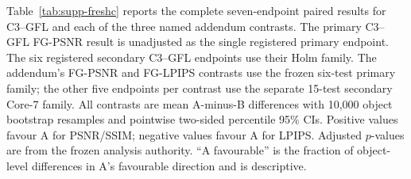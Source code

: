 \documentclass[11pt]{article}
\begin{document}
Table~\ref{tab:supp-freshc} reports the complete seven-endpoint paired results for C3--GFL and each of the three named addendum contrasts. The primary C3--GFL FG-PSNR result is unadjusted as the single registered primary endpoint. The six registered secondary C3--GFL endpoints use their Holm family. The addendum's FG-PSNR and FG-LPIPS contrasts use the frozen six-test primary family; the other five endpoints per contrast use the separate 15-test secondary Core-7 family. All contrasts are mean A-minus-B differences with 10,000 object bootstrap resamples and pointwise two-sided percentile 95\% CIs. Positive values favour A for PSNR/SSIM; negative values favour A for LPIPS. Adjusted $p$-values are from the frozen analysis authority. “A favourable” is the fraction of object-level differences in A's favourable direction and is descriptive.
\end{document}

